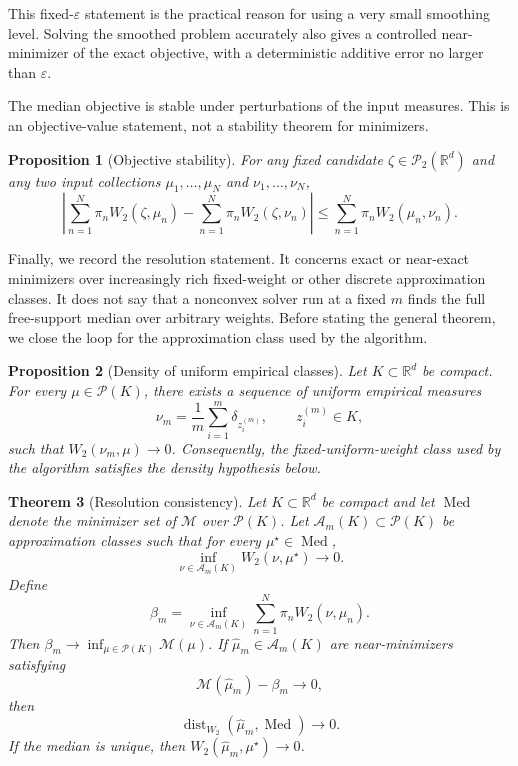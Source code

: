 \documentclass[pdflatex,sn-mathphys-ay]{sn-jnl}%
\theoremstyle{thmstyleone}%
\newtheorem{theorem}{Theorem}%
\newtheorem{proposition}[theorem]{Proposition}%
\theoremstyle{thmstyletwo}%
\theoremstyle{thmstylethree}%
\newcommand{\R}{\mathbb R}
\newcommand{\calP}{\mathcal P}
\newcommand{\calM}{\mathcal M}
\newcommand{\calA}{\mathcal A}
\newcommand{\eps}{\varepsilon}
\newcommand{\Med}{\operatorname{Med}}
\newcommand{\dist}{\operatorname{dist}}
\begin{document}
This fixed-\(\eps\) statement is the practical reason for using a very small smoothing level. Solving the smoothed problem accurately also gives a controlled near-minimizer of the exact objective, with a deterministic additive error no larger than \(\eps\).

The median objective is stable under perturbations of the input measures. This is an objective-value statement, not a stability theorem for minimizers.

\begin{proposition}[Objective stability]\label{prop:stability}
For any fixed candidate \(\zeta\in\calP_2(\R^d)\) and any two input collections \(\mu_1,\ldots,\mu_N\) and \(\nu_1,\ldots,\nu_N\),
\[
    \left|
    \sum_{n=1}^N\pi_n W_2(\zeta,\mu_n)
    -
    \sum_{n=1}^N\pi_n W_2(\zeta,\nu_n)
    \right|
    \le
    \sum_{n=1}^N\pi_n W_2(\mu_n,\nu_n).
\]
\end{proposition}

Finally, we record the resolution statement. It concerns exact or near-exact minimizers over increasingly rich fixed-weight or other discrete approximation classes. It does not say that a nonconvex solver run at a fixed \(m\) finds the full free-support median over arbitrary weights. Before stating the general theorem, we close the loop for the approximation class used by the algorithm.

\begin{proposition}[Density of uniform empirical classes]\label{prop:uniform-density}
Let \(K\subset\R^d\) be compact. For every \(\mu\in\calP(K)\), there exists a sequence of uniform empirical measures
\[
    \nu_m=\frac1m\sum_{i=1}^m\delta_{z_i^{(m)}},
    \qquad z_i^{(m)}\in K,
\]
such that \(W_2(\nu_m,\mu)\to0\). Consequently, the fixed-uniform-weight class used by the algorithm satisfies the density hypothesis below.
\end{proposition}

\begin{theorem}[Resolution consistency]\label{thm:resolution}
Let \(K\subset\R^d\) be compact and let \(\Med\) denote the minimizer set of \(\calM\) over \(\calP(K)\). Let \(\calA_m(K)\subset\calP(K)\) be approximation classes such that for every \(\mu^\star\in\Med\),
\[
    \inf_{\nu\in\calA_m(K)} W_2(\nu,\mu^\star)\to0.
\]
Define
\[
    \beta_m=\inf_{\nu\in\calA_m(K)} \sum_{n=1}^N\pi_n W_2(\nu,\mu_n).
\]
Then \(\beta_m\to \inf_{\mu\in\calP(K)}\calM(\mu)\). If \(\hat\mu_m\in\calA_m(K)\) are near-minimizers satisfying
\[
    \calM(\hat\mu_m)-\beta_m\to0,
\]
then
\[
    \dist_{W_2}(\hat\mu_m,\Med)\to0.
\]
If the median is unique, then \(W_2(\hat\mu_m,\mu^\star)\to0\).
\end{theorem}
\end{document}
